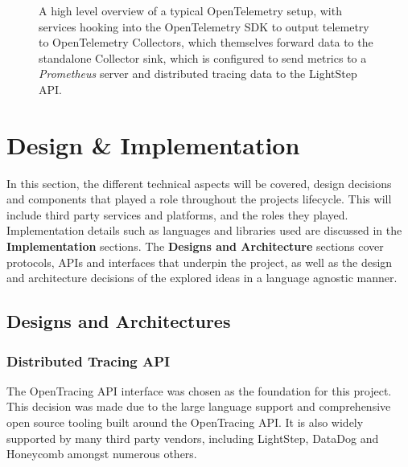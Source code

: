 \documentclass[12pt,pdftex,titlepage]{report}
\begin{document}
                \begin{figure}[hbt!]
                    \centering
                    \caption{A high level overview of a typical OpenTelemetry setup, with services hooking into the OpenTelemetry SDK to output telemetry to
                    OpenTelemetry Collectors, which themselves forward data to the standalone Collector sink, which is configured to send metrics to a \textit{Prometheus}
                    server and distributed tracing data to the LightStep API.}
                    \label{fig:otexporter}
                \end{figure}
                

    \chapter{Design \& Implementation}
        \small{In this section, the different technical aspects will be covered, design decisions and components that played a role throughout the projects lifecycle.
        This will include third party services and platforms, and the roles they played. Implementation details such as languages and libraries used are discussed in the
        \textbf{Implementation} sections. The \textbf{Designs and Architecture} sections cover protocols, APIs and interfaces that underpin the project, as well as the 
        design and architecture decisions of the explored ideas in a language agnostic manner.}

        \section{Designs and Architectures}
            \subsection{Distributed Tracing API}
                The OpenTracing API interface was chosen as the foundation for this project. This decision was made due to the large language support and comprehensive open
                source tooling built around the OpenTracing API. It is also widely supported by many third party vendors, including LightStep, DataDog and Honeycomb amongst 
                numerous others.
\end{document}
